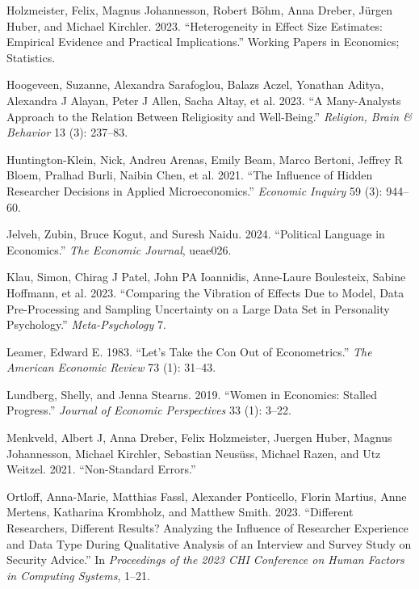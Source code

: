 \documentclass[
  letterpaper,
  DIV=11,
  numbers=noendperiod]{scrartcl}
\newlength{\cslhangindent}
\newlength{\cslentryspacingunit} %
\newenvironment{CSLReferences}[2] %
 {%
  \setlength{\parindent}{0pt}
  \ifodd #1
  \let\oldpar\par
  \def\par{\hangindent=\cslhangindent\oldpar}
  \fi
  \setlength{\parskip}{#2\cslentryspacingunit}
 }%
 {}
\begin{document}
\begin{CSLReferences}{1}{0}
\leavevmode{}%
Holzmeister, Felix, Magnus Johannesson, Robert Böhm, Anna Dreber, Jürgen
Huber, and Michael Kirchler. 2023. {``Heterogeneity in Effect Size
Estimates: Empirical Evidence and Practical Implications.''} Working
Papers in Economics; Statistics.

\leavevmode{}%
Hoogeveen, Suzanne, Alexandra Sarafoglou, Balazs Aczel, Yonathan Aditya,
Alexandra J Alayan, Peter J Allen, Sacha Altay, et al. 2023. {``A
Many-Analysts Approach to the Relation Between Religiosity and
Well-Being.''} \emph{Religion, Brain \& Behavior} 13 (3): 237--83.

\leavevmode{}%
Huntington-Klein, Nick, Andreu Arenas, Emily Beam, Marco Bertoni,
Jeffrey R Bloem, Pralhad Burli, Naibin Chen, et al. 2021. {``The
Influence of Hidden Researcher Decisions in Applied Microeconomics.''}
\emph{Economic Inquiry} 59 (3): 944--60.

\leavevmode{}%
Jelveh, Zubin, Bruce Kogut, and Suresh Naidu. 2024. {``Political
Language in Economics.''} \emph{The Economic Journal}, ueae026.

\leavevmode{}%
Klau, Simon, Chirag J Patel, John PA Ioannidis, Anne-Laure Boulesteix,
Sabine Hoffmann, et al. 2023. {``Comparing the Vibration of Effects Due
to Model, Data Pre-Processing and Sampling Uncertainty on a Large Data
Set in Personality Psychology.''} \emph{Meta-Psychology} 7.

\leavevmode{}%
Leamer, Edward E. 1983. {``Let's Take the Con Out of Econometrics.''}
\emph{The American Economic Review} 73 (1): 31--43.

\leavevmode{}%
Lundberg, Shelly, and Jenna Stearns. 2019. {``Women in Economics:
Stalled Progress.''} \emph{Journal of Economic Perspectives} 33 (1):
3--22.

\leavevmode{}%
Menkveld, Albert J, Anna Dreber, Felix Holzmeister, Juergen Huber,
Magnus Johannesson, Michael Kirchler, Sebastian Neusüss, Michael Razen,
and Utz Weitzel. 2021. {``Non-Standard Errors.''}

\leavevmode{}%
Ortloff, Anna-Marie, Matthias Fassl, Alexander Ponticello, Florin
Martius, Anne Mertens, Katharina Krombholz, and Matthew Smith. 2023.
{``Different Researchers, Different Results? Analyzing the Influence of
Researcher Experience and Data Type During Qualitative Analysis of an
Interview and Survey Study on Security Advice.''} In \emph{Proceedings
of the 2023 CHI Conference on Human Factors in Computing Systems},
1--21.


\end{CSLReferences}
\end{document}
